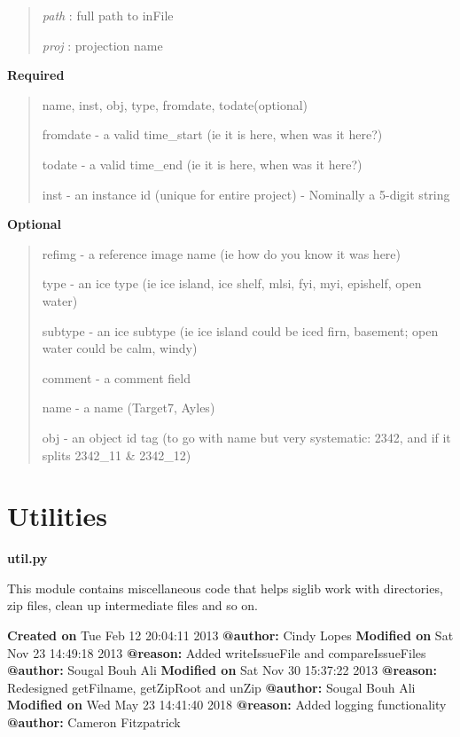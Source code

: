 \documentclass[letterpaper,10pt,english]{sphinxmanual}
\begin{document}
\begin{fulllineitems}
\begin{fulllineitems}
\begin{quote}
\emph{path}   : full path to inFile

\emph{proj}   : projection name
\end{quote}

\textbf{Required}
\begin{quote}

name, inst, obj, type, fromdate, todate(optional)

fromdate - a valid time\_start (ie it is here, when was it here?)

todate   - a valid time\_end (ie it is here, when was it here?)

inst     - an instance id (unique for entire project) - Nominally a 5-digit string
\end{quote}

\textbf{Optional}
\begin{quote}

refimg   - a reference image name (ie how do you know it was here)

type     - an ice type (ie ice island, ice shelf, mlsi, fyi, myi, epishelf, open water)

subtype  - an ice subtype (ie ice island could be iced firn, basement; open water could be calm, windy)

comment  - a comment field

name     - a name (Target7, Ayles)

obj      - an object id tag (to go with name but very systematic: 2342, and if it splits 2342\_11 \& 2342\_12)
\end{quote}

\end{fulllineitems}


\end{fulllineitems}



\section{Utilities}
\label{code:module-Util}\label{code:utilities}
\textbf{util.py}

This module contains miscellaneous code that helps siglib work with directories, 
zip files, clean up intermediate files and so on.

\textbf{Created on} Tue Feb 12 20:04:11 2013 \textbf{@author:} Cindy Lopes
\textbf{Modified on} Sat Nov 23 14:49:18 2013 \textbf{@reason:} Added writeIssueFile and compareIssueFiles \textbf{@author:} Sougal Bouh Ali
\textbf{Modified on} Sat Nov 30 15:37:22 2013 \textbf{@reason:} Redesigned getFilname, getZipRoot and unZip \textbf{@author:} Sougal Bouh Ali
\textbf{Modified on} Wed May 23 14:41:40 2018 \textbf{@reason:} Added logging functionality \textbf{@author:} Cameron Fitzpatrick
\end{document}
